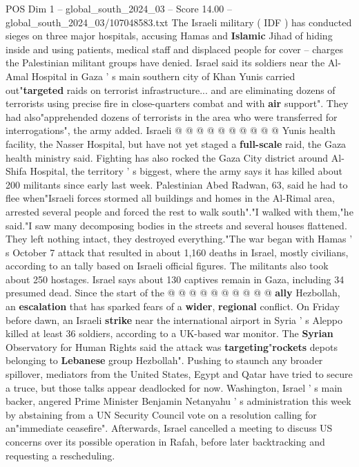 \begin{textsample}{POS Dim 1 – global\_south\_2024\_03 – Score 14.00 – global\_south\_2024\_03/107048583.txt}
The Israeli military ( IDF ) has conducted sieges on three major hospitals, accusing Hamas and \textbf{Islamic} Jihad of hiding inside and using patients, medical staff and displaced people for cover -- charges the Palestinian militant groups have denied.
Israel said its soldiers near the Al-Amal Hospital in Gaza ' s main southern city of Khan Yunis carried out"\textbf{targeted} raids on terrorist infrastructure... and are eliminating dozens of terrorists using precise fire in close-quarters combat and with \textbf{air} support".
They had also"apprehended dozens of terrorists in the area who were transferred for interrogations", the army added.
Israeli @ @ @ @ @ @ @ @ @ @ Yunis health facility, the Nasser Hospital, but have not yet staged a \textbf{full-scale} raid, the Gaza health ministry said.
Fighting has also rocked the Gaza City district around Al-Shifa Hospital, the territory ' s biggest, where the army says it has killed about 200 militants since early last week.
Palestinian Abed Radwan, 63, said he had to flee when"Israeli forces stormed all buildings and homes in the Al-Rimal area, arrested several people and forced the rest to walk south"."I walked with them,"he said."I saw many decomposing bodies in the streets and several houses flattened.
They left nothing intact, they destroyed everything."The war began with Hamas ' s October 7 attack that resulted in about 1,160 deaths in Israel, mostly civilians, according to an tally based on Israeli official figures.
The militants also took about 250 hostages.
Israel says about 130 captives remain in Gaza, including 34 presumed dead.
Since the start of the @ @ @ @ @ @ @ @ @ @ \textbf{ally} Hezbollah, an \textbf{escalation} that has sparked fears of a \textbf{wider}, \textbf{regional} conflict.
On Friday before dawn, an Israeli \textbf{strike} near the international airport in Syria ' s Aleppo killed at least 36 soldiers, according to a UK-based war monitor.
The \textbf{Syrian} Observatory for Human Rights said the attack was \textbf{targeting}"\textbf{rockets} depots belonging to \textbf{Lebanese} group Hezbollah".
Pushing to staunch any broader spillover, mediators from the United States, Egypt and Qatar have tried to secure a truce, but those talks appear deadlocked for now.
Washington, Israel ' s main backer, angered Prime Minister Benjamin Netanyahu ' s administration this week by abstaining from a UN Security Council vote on a resolution calling for an"immediate ceasefire".
Afterwards, Israel cancelled a meeting to discuss US concerns over its possible operation in Rafah, before later backtracking and requesting a rescheduling.

\end{textsample}
